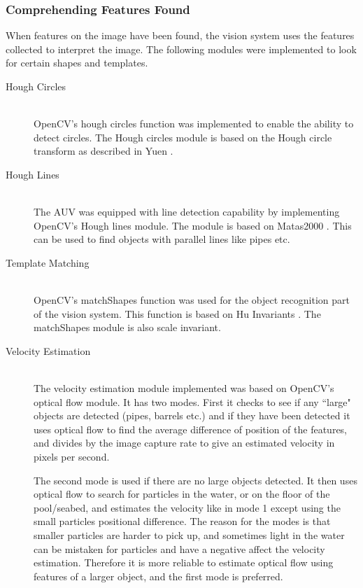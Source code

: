 \subsubsection{Comprehending Features Found} 
When features on the image have been found, the vision system uses the features collected to interpret the image. The following modules were implemented to look for certain shapes and templates.
\begin{description}
\item[Hough Circles]\hfill \\
OpenCV's hough circles function was implemented to enable the ability to detect circles. The Hough circles module is based on the Hough circle transform as described in Yuen \cite{article:yuen}. 

\item[Hough Lines]\hfill \\
The AUV was equipped with line detection capability by implementing OpenCV's Hough lines module. The module is based on Matas2000 \cite{article:matas}. This can be used to find objects with parallel lines like pipes etc.

\item[Template Matching]\hfill \\
OpenCV's matchShapes function was used for the object recognition part of the vision system. This function is based on Hu Invariants \cite{article:hu}. The matchShapes module is also scale invariant.

\item[Velocity Estimation]\hfill \\
The velocity estimation module implemented was based on OpenCV's optical flow module. It has two modes. First it checks to see if any ``large" objects are detected (pipes, barrels etc.) and if they have been detected it uses optical flow to find the average difference of position of the features, and divides by the image capture rate to give an estimated velocity in pixels per second.
 
The second mode is used if there are no large objects detected. It then uses optical flow to search for particles in the water, or on the floor of the pool/seabed, and estimates the velocity like in mode 1 except using the small particles positional difference. The reason for the modes is that smaller particles are harder to pick up, and sometimes light in the water can be mistaken for particles and have a negative affect the velocity estimation. Therefore it is more reliable to estimate optical flow using features of a larger object, and the first mode is preferred.
\end{description}

